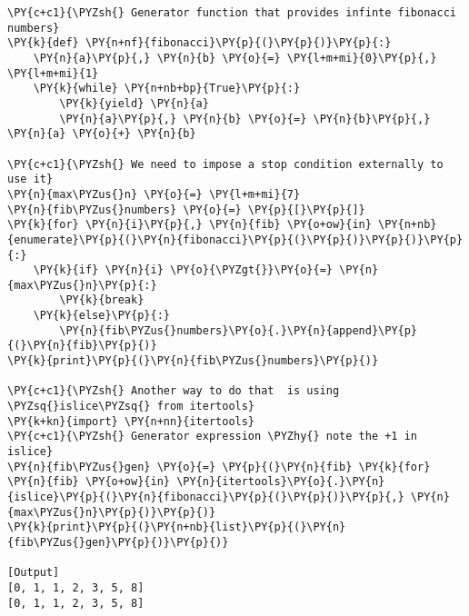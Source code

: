 \begin{Verbatim}[label=\makebox{\url{https://github.com/lucabaldini/cmepda/tree/master/slides/latex/snippets/fibonacci.py}},commandchars=\\\{\}]
\PY{c+c1}{\PYZsh{} Generator function that provides infinte fibonacci numbers}
\PY{k}{def} \PY{n+nf}{fibonacci}\PY{p}{(}\PY{p}{)}\PY{p}{:}
    \PY{n}{a}\PY{p}{,} \PY{n}{b} \PY{o}{=} \PY{l+m+mi}{0}\PY{p}{,} \PY{l+m+mi}{1}
    \PY{k}{while} \PY{n+nb+bp}{True}\PY{p}{:}
        \PY{k}{yield} \PY{n}{a}
        \PY{n}{a}\PY{p}{,} \PY{n}{b} \PY{o}{=} \PY{n}{b}\PY{p}{,} \PY{n}{a} \PY{o}{+} \PY{n}{b}

\PY{c+c1}{\PYZsh{} We need to impose a stop condition externally to use it}
\PY{n}{max\PYZus{}n} \PY{o}{=} \PY{l+m+mi}{7}
\PY{n}{fib\PYZus{}numbers} \PY{o}{=} \PY{p}{[}\PY{p}{]}
\PY{k}{for} \PY{n}{i}\PY{p}{,} \PY{n}{fib} \PY{o+ow}{in} \PY{n+nb}{enumerate}\PY{p}{(}\PY{n}{fibonacci}\PY{p}{(}\PY{p}{)}\PY{p}{)}\PY{p}{:}
    \PY{k}{if} \PY{n}{i} \PY{o}{\PYZgt{}}\PY{o}{=} \PY{n}{max\PYZus{}n}\PY{p}{:}
        \PY{k}{break}
    \PY{k}{else}\PY{p}{:}
        \PY{n}{fib\PYZus{}numbers}\PY{o}{.}\PY{n}{append}\PY{p}{(}\PY{n}{fib}\PY{p}{)}
\PY{k}{print}\PY{p}{(}\PY{n}{fib\PYZus{}numbers}\PY{p}{)}
      
\PY{c+c1}{\PYZsh{} Another way to do that  is using \PYZsq{}islice\PYZsq{} from itertools}
\PY{k+kn}{import} \PY{n+nn}{itertools}
\PY{c+c1}{\PYZsh{} Generator expression \PYZhy{} note the +1 in islice}
\PY{n}{fib\PYZus{}gen} \PY{o}{=} \PY{p}{(}\PY{n}{fib} \PY{k}{for} \PY{n}{fib} \PY{o+ow}{in} \PY{n}{itertools}\PY{o}{.}\PY{n}{islice}\PY{p}{(}\PY{n}{fibonacci}\PY{p}{(}\PY{p}{)}\PY{p}{,} \PY{n}{max\PYZus{}n}\PY{p}{)}\PY{p}{)}
\PY{k}{print}\PY{p}{(}\PY{n+nb}{list}\PY{p}{(}\PY{n}{fib\PYZus{}gen}\PY{p}{)}\PY{p}{)}

[Output]
[0, 1, 1, 2, 3, 5, 8]
[0, 1, 1, 2, 3, 5, 8]
\end{Verbatim}